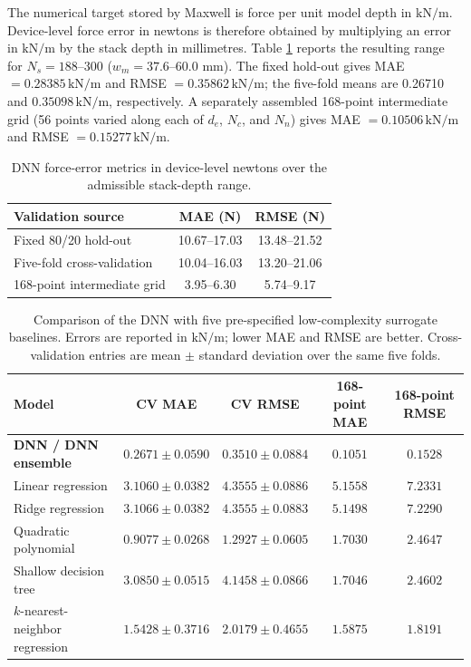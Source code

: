 The numerical target stored by Maxwell is force per unit model depth in $\mathrm{kN/m}$. Device-level force error in newtons is therefore obtained by multiplying an error in $\mathrm{kN/m}$ by the stack depth in millimetres. Table \ref{tab:dnn_metrics_n} reports the resulting range for $N_s=188$--300 ($w_m=37.6$--60.0 mm). The fixed hold-out gives MAE $=0.28385\,\mathrm{kN/m}$ and RMSE $=0.35862\,\mathrm{kN/m}$; the five-fold means are 0.26710 and $0.35098\,\mathrm{kN/m}$, respectively. A separately assembled 168-point intermediate grid (56 points varied along each of $d_e$, $N_c$, and $N_n$) gives MAE $=0.10506\,\mathrm{kN/m}$ and RMSE $=0.15277\,\mathrm{kN/m}$.
\begin{table}[htbp]
\centering
\small
\caption{DNN force-error metrics in device-level newtons over the admissible stack-depth range.}
\label{tab:dnn_metrics_n}
\begin{tabular}{lcc}
\toprule
Validation source & MAE (N) & RMSE (N)\\
\midrule
Fixed 80/20 hold-out & 10.67--17.03 & 13.48--21.52\\
Five-fold cross-validation & 10.04--16.03 & 13.20--21.06\\
168-point intermediate grid & 3.95--6.30 & 5.74--9.17\\
\bottomrule
\end{tabular}
\end{table}
\begin{table}[htbp]
\centering
\small
\caption{Comparison of the DNN with five pre-specified low-complexity surrogate baselines. Errors are reported in $\mathrm{kN/m}$; lower MAE and RMSE are better. Cross-validation entries are mean $\pm$ standard deviation over the same five folds.}
\label{tab:surrogate_comparison}
\begin{tabular}{lcccc}
\toprule
Model & CV MAE & CV RMSE & 168-point MAE & 168-point RMSE \\
\midrule
\textbf{DNN / DNN ensemble} & $\mathbf{0.2671\pm0.0590}$ & $\mathbf{0.3510\pm0.0884}$ & $\mathbf{0.1051}$ & $\mathbf{0.1528}$ \\
Linear regression & $3.1060\pm0.0382$ & $4.3555\pm0.0886$ & $5.1558$ & $7.2331$ \\
Ridge regression & $3.1066\pm0.0382$ & $4.3555\pm0.0883$ & $5.1498$ & $7.2290$ \\
Quadratic polynomial & $0.9077\pm0.0268$ & $1.2927\pm0.0605$ & $1.7030$ & $2.4647$ \\
Shallow decision tree & $3.0850\pm0.0515$ & $4.1458\pm0.0866$ & $1.7046$ & $2.4602$ \\
$k$-nearest-neighbor regression & $1.5428\pm0.3716$ & $2.0179\pm0.4655$ & $1.5875$ & $1.8191$ \\
\bottomrule
\end{tabular}
\end{table}
